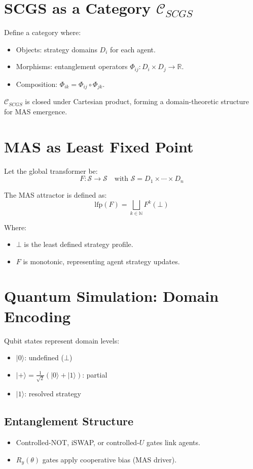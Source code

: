 \documentclass[11pt]{article}
\begin{document}
\section{SCGS as a Category \texorpdfstring{$\mathcal{C}_{SCGS}$}{C\_SCGS}}

Define a category where:
\begin{itemize}[noitemsep]
    \item Objects: strategy domains $D_i$ for each agent.
    \item Morphisms: entanglement operators $\Phi_{ij}: D_i \times D_j \to \mathbb{R}$.
    \item Composition: $\Phi_{ik} = \Phi_{ij} \circ \Phi_{jk}$.
\end{itemize}

$\mathcal{C}_{SCGS}$ is closed under Cartesian product, forming a domain-theoretic structure for MAS emergence.

\section{MAS as Least Fixed Point}

Let the global transformer be:
\[
F: \mathcal{S} \to \mathcal{S}
\quad \text{with } \mathcal{S} = D_1 \times \cdots \times D_n
\]

The MAS attractor is defined as:
\[
\text{lfp}(F) = \bigsqcup_{k \in \mathbb{N}} F^k(\bot)
\]

Where:
\begin{itemize}[noitemsep]
    \item $\bot$ is the least defined strategy profile.
    \item $F$ is monotonic, representing agent strategy updates.
\end{itemize}

\section{Quantum Simulation: Domain Encoding}

Qubit states represent domain levels:
\begin{itemize}[noitemsep]
    \item $|0\rangle$: undefined ($\bot$)
    \item $|+\rangle = \frac{1}{\sqrt{2}}(|0\rangle + |1\rangle)$: partial
    \item $|1\rangle$: resolved strategy
\end{itemize}

\subsection*{Entanglement Structure}
\begin{itemize}[noitemsep]
    \item Controlled-NOT, iSWAP, or controlled-$U$ gates link agents.
    \item $R_y(\theta)$ gates apply cooperative bias (MAS driver).
\end{itemize}
\end{document}
